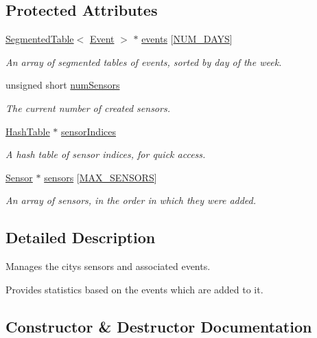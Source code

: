\subsection*{Protected Attributes}
\begin{DoxyCompactItemize}
\item 
\hyperlink{class_segmented_table}{Segmented\+Table}$<$ \hyperlink{class_event}{Event} $>$ $\ast$ \hyperlink{class_city_a178a78d0e7e87a0f7a1ede3804fd7c5e}{events} \mbox{[}\hyperlink{config_8h_a7780285633ba315a821a72ae797e422e}{N\+U\+M\+\_\+\+D\+A\+Y\+S}\mbox{]}
\begin{DoxyCompactList}\small\item\em An array of segmented tables of events, sorted by day of the week. \end{DoxyCompactList}\item 
unsigned short \hyperlink{class_city_a2b51b4ba827af8b46f9f3842e7c5c712}{num\+Sensors}
\begin{DoxyCompactList}\small\item\em The current number of created sensors. \end{DoxyCompactList}\item 
\hyperlink{class_hash_table}{Hash\+Table} $\ast$ \hyperlink{class_city_a3a22ef53bdf112feb314774d98e9e4c8}{sensor\+Indices}
\begin{DoxyCompactList}\small\item\em A hash table of sensor indices, for quick access. \end{DoxyCompactList}\item 
\hyperlink{class_sensor}{Sensor} $\ast$ \hyperlink{class_city_a195bcbb3cf70fa5f5d1ac8844e8e1b1c}{sensors} \mbox{[}\hyperlink{config_8h_aeb314256fac035649e7b7df9e17ef655}{M\+A\+X\+\_\+\+S\+E\+N\+S\+O\+R\+S}\mbox{]}
\begin{DoxyCompactList}\small\item\em An array of sensors, in the order in which they were added. \end{DoxyCompactList}\end{DoxyCompactItemize}


\subsection{Detailed Description}
Manages the city\textquotesingle{}s sensors and associated events. 

Provides statistics based on the events which are added to it. 

\subsection{Constructor \& Destructor Documentation}
\hypertarget{class_city_a1b1f549430f0a7ecd0ec7b1605415193}{}
